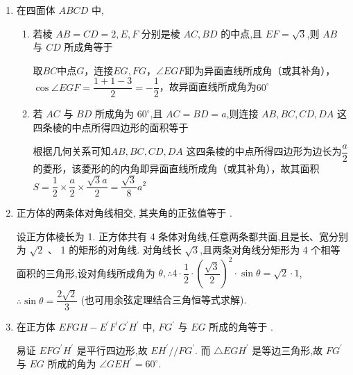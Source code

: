 \begin{enumerate}
\begin{enumerate}
\begin{jieda}
            $\angle{DA_1C_1}$即为异面直线所成角（或其补角） $\cos \angle DA_1C_1 = \dfrac{6+4-4}{4\sqrt{6}} = \dfrac{\sqrt{6}}{4}$.
        \end{jieda}
        \item 若底面边长 ${AB} = {BC} = 3$,棱 $A{A}_{1} = 4$,则异面直线 $A{B}_{1}$ 与 ${A}_{1}D$ 所成角的余弦值等于
        \begin{jieda}
            $\angle{AB_1C}$即为异面直线所成角（或其补角） $\cos \angle AB_1C = \dfrac{25+25-18}{50} = \dfrac{16}{25}$ 
        \end{jieda}
    \end{enumerate}
    \item 在四面体 ${ABCD}$ 中,
    \begin{enumerate}
        \item 若棱 ${AB} = {CD} = 2,E,F$ 分别是棱 ${AC},{BD}$ 的中点,且 ${EF} = \sqrt{3}$,则 ${AB}$ 与 ${CD}$ 所成角等于
        \begin{jieda}
            取$BC$中点$G$，连接$EG, FG$，$\angle{EGF}$即为异面直线所成角（或其补角），$\cos \angle EGF = \dfrac{1+1-3}{2} = -\dfrac{1}{2}$，故异面直线所成角为$60^\circ$
        \end{jieda}
        \item 若 ${AC}$ 与 ${BD}$ 所成角为 ${60}^{ \circ  }$,且 ${AC} = {BD} = a$,则连接 ${AB},{BC},{CD},{DA}$ 这四条棱的中点所得四边形的面积等于
        \begin{jieda}
            根据几何关系可知${AB},{BC},{CD},{DA}$ 这四条棱的中点所得四边形为边长为$\dfrac{a}{2}$的菱形，该菱形的的内角即异面直线所成角（或其补角），故其面积$S = \dfrac{1}{2}\times \dfrac{a}{2} \times \dfrac{\sqrt{3}a}{2} = \dfrac{\sqrt{3}}{8}{a}^{2}$
        \end{jieda}
    \end{enumerate}
    \item 正方体的两条体对角线相交, 其夹角的正弦值等于 .
    \begin{jieda}
        设正方体棱长为 1. 正方体共有 4 条体对角线,任意两条都共面,且是长、宽分别为 $\sqrt{2}$ 、 1 的矩形的对角线. 对角线长 $\sqrt{3}$,且两条对角线分矩形为 4 个相等面积的三角形,设对角线所成角为 $\theta,\therefore 4 \cdot  \dfrac{1}{2} \cdot  {\left( \dfrac{\sqrt{3}}{2}\right) }^{2} \cdot  \sin \theta  = \sqrt{2} \cdot  1$,
        $\therefore \sin \theta  = \dfrac{2\sqrt{2}}{3}$ (也可用余弦定理结合三角恒等式求解).
    \end{jieda}
    \item 在正方体 ${EFGH} - {E}^{\prime }{F}^{\prime }{G}^{\prime }{H}^{\prime }$ 中, $F{G}^{\prime }$ 与 ${EG}$ 所成的角等于 .
    \begin{jieda}
        易证 ${EF}{G}^{\prime }{H}^{\prime }$ 是平行四边形,故 $E{H}^{\prime }//F{G}^{\prime }$. 而 $\bigtriangleup {EG}{H}^{\prime }$ 是等边三角形,故 $F{G}^{\prime }$ 与 ${EG}$ 所成的角为 $\angle {GE}{H}^{\prime } = {60}^{ \circ  }$.
    \end{jieda}


\end{enumerate}
